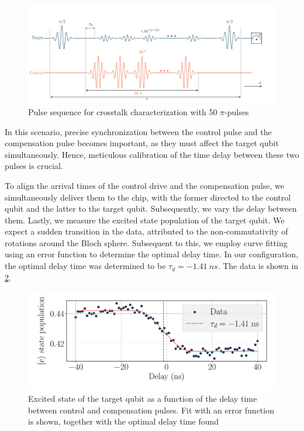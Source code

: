 \begin{figure}
    \centering
    \includegraphics[width=0.95\linewidth]{Images//Chap2.0/diagram_gaussian.pdf}
    \vspace{-0.3cm}
    \caption{Pulse sequence for crosstalk characterization with 50 $\pi$-pulses}
    \label{fig:train_gauss}
\end{figure}

In this scenario, precise synchronization between the control pulse and the compensation pulse becomes important, as they must affect the target qubit simultaneously.
Hence, meticulous calibration of the time delay between these two pulses is crucial.

To align the arrival times of the control drive and the compensation pulse, we simultaneously deliver them to the chip, with the former directed to the control qubit and the latter to the target qubit.
Subsequently, we vary the delay between them.
Lastly, we measure the excited state population of the target qubit.
We expect a sudden transition in the data, attributed to the non-commutativity of rotations around the Bloch sphere.
Subsequent to this, we employ curve fitting using an error function to determine the optimal delay time.
In our configuration, the optimal delay time was determined to be $\tau_d = \SI{-1.41}{ns}$.
The data is shown in \cref{fig:delay}.

\begin{figure}
    \centering
    \includegraphics[width=0.8\linewidth]{Images//Chap2.0/delay.pdf}
    \vspace{-0.5cm}
    \caption{Excited state of the target qubit as a function of the delay time between control and compensation pulses. Fit with an error function is shown, together with the optimal delay time found}
    \label{fig:delay}
\end{figure}


